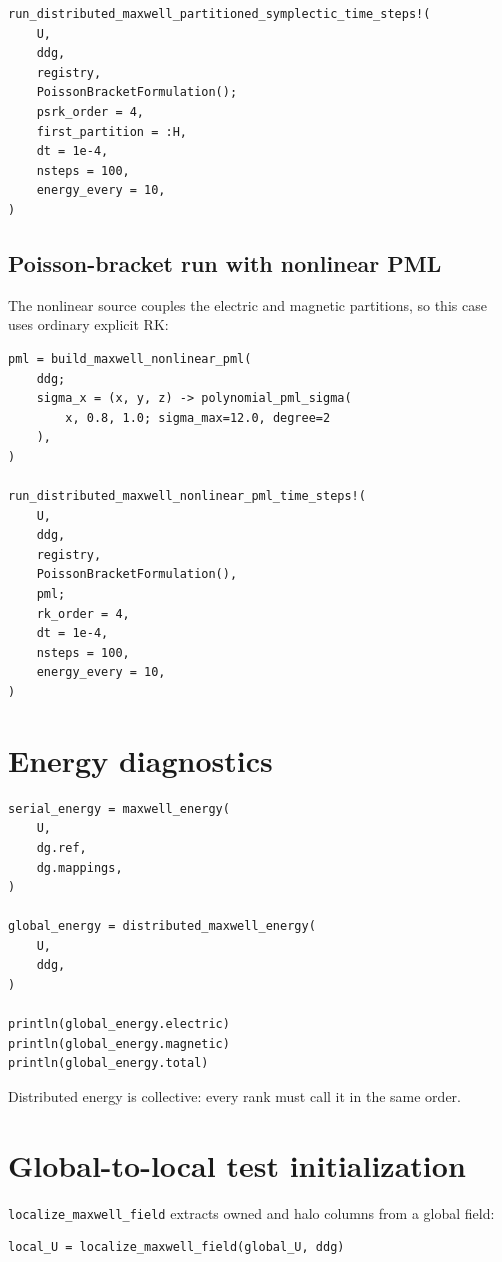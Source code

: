 \documentclass[11pt,oneside]{book}
\newcommand{\code}[1]{\texttt{#1}}
\begin{document}
\begin{lstlisting}
run_distributed_maxwell_partitioned_symplectic_time_steps!(
    U,
    ddg,
    registry,
    PoissonBracketFormulation();
    psrk_order = 4,
    first_partition = :H,
    dt = 1e-4,
    nsteps = 100,
    energy_every = 10,
)
\end{lstlisting}

\subsection{Poisson-bracket run with nonlinear PML}

The nonlinear source couples the electric and magnetic partitions, so this
case uses ordinary explicit RK:
\begin{lstlisting}
pml = build_maxwell_nonlinear_pml(
    ddg;
    sigma_x = (x, y, z) -> polynomial_pml_sigma(
        x, 0.8, 1.0; sigma_max=12.0, degree=2
    ),
)

run_distributed_maxwell_nonlinear_pml_time_steps!(
    U,
    ddg,
    registry,
    PoissonBracketFormulation(),
    pml;
    rk_order = 4,
    dt = 1e-4,
    nsteps = 100,
    energy_every = 10,
)
\end{lstlisting}

\section{Energy diagnostics}

\begin{lstlisting}
serial_energy = maxwell_energy(
    U,
    dg.ref,
    dg.mappings,
)

global_energy = distributed_maxwell_energy(
    U,
    ddg,
)

println(global_energy.electric)
println(global_energy.magnetic)
println(global_energy.total)
\end{lstlisting}

Distributed energy is collective: every rank must call it in the same order.

\section{Global-to-local test initialization}

\code{localize\_maxwell\_field} extracts owned and halo columns from a global
field:

\begin{lstlisting}
local_U = localize_maxwell_field(global_U, ddg)
\end{lstlisting}
\end{document}
